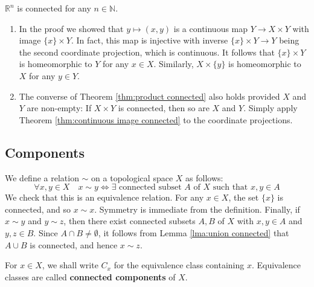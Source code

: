 \documentclass[a4paper]{article}
\begin{document}
\begin{example}
    $\mathbb{R}^{n}$ is connected for any $n \in \mathbb{N}$.
\end{example}

\begin{remark}
    \begin{enumerate}
        \item In the proof we showed that $y \mapsto(x, y)$ is a continuous map $Y \rightarrow X \times Y$ with image $\{x\} \times Y$. In fact, this map is injective with inverse $\{x\} \times Y \rightarrow Y$ being the second coordinate projection, which is continuous. It follows that $\{x\} \times Y$ is homeomorphic to $Y$ for any $x \in X$. Similarly, $X \times\{y\}$ is homeomorphic to $X$ for any $y \in Y$.
      
        \item The converse of Theorem \ref{thm:product connected} also holds provided $X$ and $Y$ are non-empty: If $X \times Y$ is connected, then so are $X$ and $Y$. Simply apply Theorem \ref{thm:continuous image connected} to the coordinate projections.
      \end{enumerate}
\end{remark}

\subsection{Components}
We define a relation $\sim$ on a topological space $X$ as follows:
$$
\forall x, y \in X \quad x \sim y \Longleftrightarrow \exists \text { connected subset } A \text { of } X \text { such that } x, y \in A
$$
We check that this is an equivalence relation. For any $x \in X$, the set $\{x\}$ is connected, and so $x \sim x$. Symmetry is immediate from the definition. Finally, if $x \sim y$ and $y \sim z$, then there exist connected subsets $A, B$ of $X$ with $x, y \in A$ and $y, z \in B$. Since $A \cap B \neq \emptyset$, it follows from Lemma \ref{lma:union connected} that $A \cup B$ is connected, and hence $x \sim z$. 
\begin{definition}
    For $x \in X$, we shall write $C_{x}$ for the equivalence class containing $x$. Equivalence classes are called \textbf{connected components} of $X$.
\end{definition}
\end{document}
